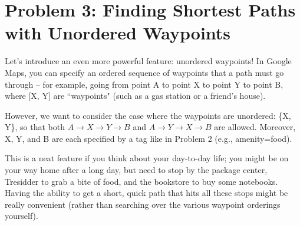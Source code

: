 \documentclass{article}
\theoremstyle{case}
\theoremstyle{definition}
\begin{document}
\newpage

\section*{Problem 3: Finding Shortest Paths with Unordered Waypoints}


  Let's introduce an even more powerful feature: unordered waypoints! In Google Maps, you can specify an ordered
  sequence of waypoints that a path must go through – for example, going from point A to point X to point Y to point B,
  where [X, Y] are ``waypoints" (such as a gas station or a friend's house).


  However, we want to consider the case where the waypoints are unordered: \{X, Y\}, so that both $A \rightarrow X \rightarrow Y \rightarrow B$
  and $A \rightarrow Y \rightarrow X \rightarrow B$ are allowed. Moreover, X, Y, and B are each specified by a tag like in Problem 2 (e.g.,
  amenity=food).


  This is a neat feature if you think about your day-to-day life; you might be on your way home after a long day, but
  need to stop by the package center, Tresidder to grab a bite of food, and the bookstore to buy some notebooks. Having
  the ability to get a short, quick path that hits all these stops might be really convenient (rather than searching
  over the various waypoint orderings yourself).
\end{document}
